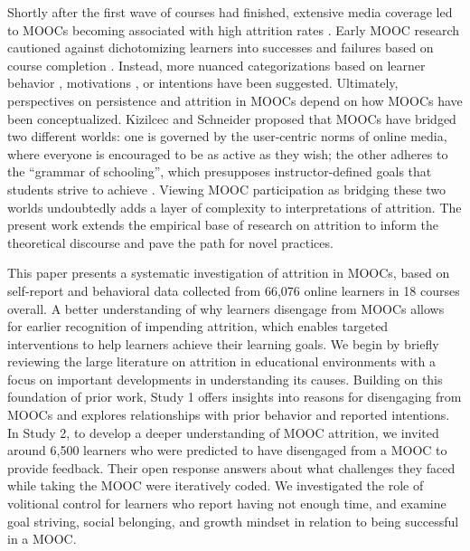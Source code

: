 \documentclass{sigchi}\usepackage[]{graphicx}\usepackage[]{color}
\begin{document}
Shortly after the first wave of courses had finished, extensive media coverage led to MOOCs becoming associated with high attrition rates \cite{lewin2013after,parr2013mooc,guthrie2013moocs}. Early MOOC research cautioned against dichotomizing learners into successes and failures based on course completion \cite{kizilcec2013deconstructing,rivard2013measuring}. Instead, more nuanced categorizations based on learner behavior \cite{kizilcec2013deconstructing,clow2013moocs}, motivations \cite{kizilcec2015motivation}, or intentions \cite{wilkowski2014student} have been suggested. Ultimately, perspectives on persistence and attrition in MOOCs depend on how MOOCs have been conceptualized. Kizilcec and Schneider \citeyear{kizilcec2015motivation} proposed that MOOCs have bridged two different worlds: one is governed by the user-centric norms of online media, where everyone is encouraged to be as active as they wish; the other adheres to the ``grammar of schooling'', which presupposes instructor-defined goals that students strive to achieve \cite{tyack1994grammar}. Viewing MOOC participation as bridging these two worlds undoubtedly adds a layer of complexity to interpretations of attrition. The present work extends the empirical base of research on attrition to inform the theoretical discourse and pave the path for novel practices.

This paper presents a systematic investigation of attrition in MOOCs, based on self-report and behavioral data collected from 66,076 online learners in 18 courses overall. A better understanding of why learners disengage from MOOCs allows for earlier recognition of impending attrition, which enables targeted interventions to help learners achieve their learning goals. We begin by briefly reviewing the large literature on attrition in educational environments with a focus on important developments in understanding its causes. Building on this foundation of prior work, Study 1 offers insights into reasons for disengaging from MOOCs and explores relationships with prior behavior and reported intentions. In Study 2, to develop a deeper understanding of MOOC attrition, we invited around 6,500 learners who were predicted to have disengaged from a MOOC to provide feedback. Their open response answers about what challenges they faced while taking the MOOC were iteratively coded. We investigated the role of volitional control for learners who report having not enough time, and examine goal striving, social belonging, and growth mindset in relation to being successful in a MOOC.
\end{document}
